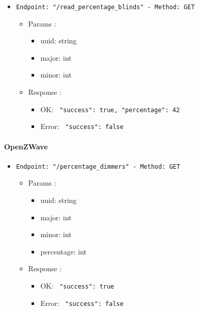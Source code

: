 \begin{itemize}
  \item \texttt{Endpoint: "/read_percentage_blinds" -  Method: GET}
  \begin{itemize} 
    \item Params :
    \begin{itemize}
      \item uuid: string
      \item major: int
      \item minor: int
    \end{itemize}

    \item Response : 
    \begin{itemize}
      \item OK: \texttt{{ "success": true, "percentage": 42 }}
      \item Error: \texttt{{ "success": false }}
    \end{itemize}
  \end{itemize}
\end{itemize}



\paragraph{OpenZWave}

\begin{itemize}
  \item \texttt{Endpoint: "/percentage_dimmers" -  Method: GET}
  \begin{itemize} 
    \item Params :
    \begin{itemize}
      \item uuid: string
      \item major: int
      \item minor: int
      \item percentage: int
    \end{itemize}

    \item Response : 
    \begin{itemize}
      \item OK: \texttt{{ "success": true }}
      \item Error: \texttt{{ "success": false }}
    \end{itemize}
  \end{itemize}
\end{itemize}

